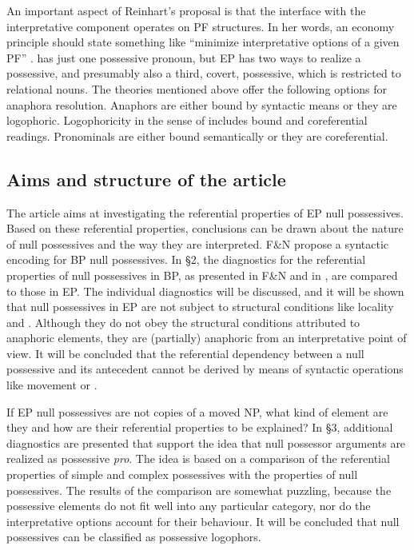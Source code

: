 \documentclass[output=paper]{langsci/langscibook}
\begin{document}
An important aspect of Reinhart’s proposal is that the interface with the interpretative component operates on PF structures. In her words, an economy principle should state something like “minimize interpretative options of a given PF” \citep[103]{Reinhart2006}.  has just one possessive pronoun, but EP has two ways to realize a possessive, and presumably also a third, covert, possessive, which is restricted to relational nouns. The theories mentioned above offer the following options for anaphora resolution. Anaphors are either bound by syntactic means or they are logophoric. Logophoricity in the sense of \citet{Reuland2011} includes bound and coreferential readings. Pronominals are either bound semantically or they are coreferential.

\subsection{Aims and structure of the article}%

The article aims at investigating the referential properties of EP null possessives. Based on these referential properties, conclusions can be drawn about the nature of null possessives and the way they are interpreted. F\&N propose a syntactic encoding for BP null possessives. In §2, the diagnostics for the referential properties of null possessives in BP, as presented in F\&N and in \citet{Rodrigues2010}, are compared to those in EP. The individual diagnostics will be discussed, and it will be shown that null possessives in EP are not subject to structural conditions like locality and . Although they do not obey the structural conditions attributed to anaphoric elements, they are (partially) anaphoric from an interpretative point of view. It will be concluded that the referential dependency between a null possessive and its antecedent cannot be derived by means of syntactic operations like movement or .

If EP null possessives are not copies of a moved NP, what kind of element are they and how are their referential properties to be explained? In §3, additional diagnostics are presented that support the idea that null possessor arguments are realized as possessive \textit{pro}. The idea is based on a comparison of the referential properties of simple and complex possessives with the properties of null possessives. The results of the comparison are somewhat puzzling, because the possessive elements do not fit well into any particular category, nor do the interpretative options account for their behaviour. It will be concluded that null possessives can be classified as possessive logophors.
\end{document}
